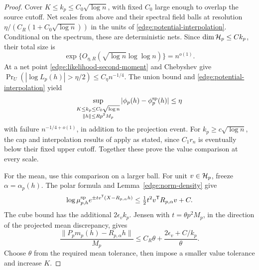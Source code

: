 \begin{proof}
Cover \(K\le k_p\le C_0\sqrt{\log n}\), with fixed \(C_0\) large enough
to overlap the source cutoff.  Net scales from above and their spectral
field balls at resolution
\(\eta/(C_R(1+C_0\sqrt{\log n}))\) in the units of
\eqref{edge:potential-interpolation}.  Conditional on the spectrum,
these are deterministic nets.  Since \(\dim\mathcal H_p\le Ck_p\), their
total size is
\[
 \exp\{O_{\eta,R}(\sqrt{\log n}\log\log n)\}=n^{o(1)}.
\]
At a net point \eqref{edge:likelihood-second-moment} and Chebyshev give
\(\Pr_U(|\log L_p(h)|>\eta/2)\le C_\eta n^{-1/4}\).
The union bound and \eqref{edge:potential-interpolation} yield
\begin{equation}\label{edge:absolute-value-comparison}
 \sup_{\substack{K\le k_p\le C_0\sqrt{\log n}\\
                  \|h\|\le Rp^2M_p}}
 |\phi_p(h)-\phi_p^{\rm sp}(h)|\le\eta
\end{equation}
with failure \(n^{-1/4+o(1)}\), in addition to the projection event.
For \(k_p\ge c\sqrt{\log n}\), the cap and interpolation results of
\cite[Proposition~2.6, Equation~(2.11), and Lemma~2.7]{FUA} apply as
stated, since \(C_1r_n\) is eventually below their fixed upper cutoff.
Together these prove the value comparison at every scale.

For the mean, use this comparison on a larger ball.  For unit
\(v\in\mathcal H_p\), freeze \(\alpha=\alpha_p(h)\).  The polar formula and
Lemma~\ref{edge:norm-density} give
\[
 \log\mu_{p,h}^{\rm sp}
       e^{\pm t v^{\mathsf T}(X-R_{p,\alpha}h)}
       \le\tfrac12t^2v^{\mathsf T}R_{p,\alpha}v+C.
\]
The cube bound has the additional \(2\epsilon_vk_p\).
Jensen with \(t=\theta p^2M_p\), in the direction of the projected
mean discrepancy, gives
\[
 \frac{\|P_pm_p(h)-R_{p,\alpha}h\|}{M_p}
       \le C_R\theta+\frac{2\epsilon_v+C/k_p}{\theta}.
\]
Choose \(\theta\) from the required mean tolerance, then impose a smaller
value tolerance and increase \(K\).


\end{proof}
